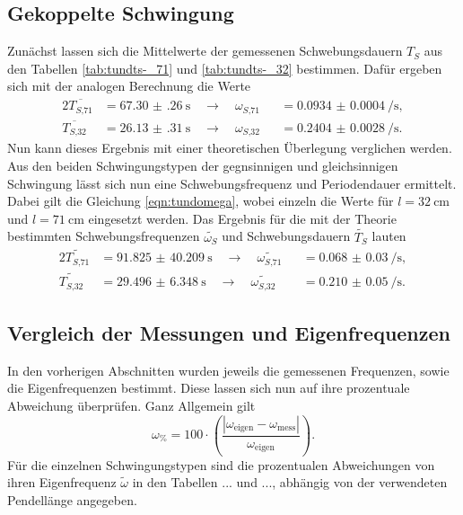 \subsection{Gekoppelte Schwingung}
Zunächst lassen sich die Mittelwerte der gemessenen Schwebungsdauern $T_{S}$ aus den Tabellen \ref{tab:tundts-_71} und \ref{tab:tundts-_32} bestimmen.
Dafür ergeben sich mit der analogen Berechnung die Werte
\begin{alignat*}{2}
    \overline{T_{S\text{,}71}} &= \SI{67.30(26)}{\second} \quad \to \quad \omega_{S\text{,}71} &&= \SI{0.0934(4)}{\per\second}, \\
    \overline{T_{S\text{,}32}} &= \SI{26.13(31)}{\second}\quad \to \quad \omega_{S\text{,}32} &&= \SI{0.2404(28)}{\per\second}. 
\end{alignat*}
Nun kann dieses Ergebnis mit einer theoretischen Überlegung verglichen werden. Aus den beiden Schwingungstypen der gegnsinnigen und gleichsinnigen Schwingung lässt sich nun eine
Schwebungsfrequenz und Periodendauer ermittelt. Dabei gilt die Gleichung \eqref{eqn:tundomega}, wobei einzeln die Werte für $l = \SI{32}{\centi\meter}$ und $l = \SI{71}{\centi\meter}$ eingesetzt werden. Das Ergebnis für die mit
der Theorie bestimmten Schwebungsfrequenzen $\tilde{\omega_{S}}$ und Schwebungsdauern $\tilde{T_{S}}$ lauten
\begin{alignat*}{2}
    \widetilde{T_{S\text{,}71}} &= \SI{91.825(40209)}{\second} \quad \to \quad \widetilde{\omega_{S\text{,}71}} &&= \SI{0.068(30)}{\per\second}, \\
    \widetilde{T_{S\text{,}32}} &= \SI{29.496(6348)}{\second}\quad \to \quad \widetilde{\omega_{S\text{,}32}} &&= \SI{0.210(50)}{\per\second}. 
\end{alignat*}

\subsection{Vergleich der Messungen und Eigenfrequenzen}
In den vorherigen Abschnitten wurden jeweils die gemessenen Frequenzen, sowie die Eigenfrequenzen bestimmt. Diese lassen sich nun auf ihre prozentuale Abweichung überprüfen. 
Ganz Allgemein gilt
\begin{equation}
        \label{eqn:lol}
    \omega_{\si{\percent}} = 100 \cdot \left( \frac{|\omega_{\text{eigen}} - \omega_{\text{mess}}|}{\omega_{\text{eigen}}} \right).
\end{equation}
Für die einzelnen Schwingungstypen sind die prozentualen Abweichungen von ihren Eigenfrequenz $\tilde{\omega}$ in den Tabellen ... und ..., abhängig von der verwendeten Pendellänge angegeben.


